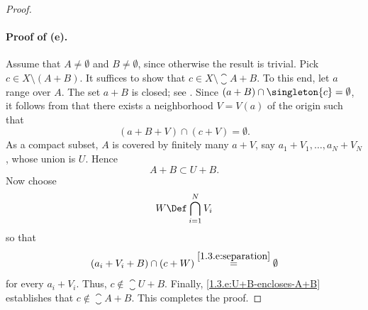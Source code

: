 \begin{proof}
\paragraph{Proof of (e).} Assume that $A\neq\emptyset$ and $B\neq\emptyset$, since otherwise the result is trivial. %
Pick $c \in X \setminus (A+B)$. It suffices to show that $c\in X\setminus\closure{A+B}$. To this end, let $a$ range over $A$. %
The set $a+B$ is closed; see . Since $(a+B) \cap \singleton{c} = \emptyset$, it follows from  that %
there exists a neighborhood $V=V(a)$ of the origin such that %
%
\begin{equation}\label{1.3.e:separation}
  (a+B + V) \cap (c+V) = \emptyset.
\end{equation}
%
As a compact subset, $A$ is covered by finitely many $a+V$, say $a_1 + V_1, \dots, a_N + V_N$, whose union is $U$. Hence 
%
\begin{equation}\label{1.3.e:U+B-encloses-A+B}
  A+B \subset U + B.
\end{equation}
%
Now choose
%
\begin{equation}
  W \Def \bigcap_{i=1}^N V_i
\end{equation}
%
so that 
%
\begin{equation}
  (a_i + V_i + B) \cap (c + W) \overset{\eqref{1.3.e:separation}}{=} \emptyset 
\end{equation}
%
for every $a_i + V_i$. Thus, $c \notin \closure{U + B}$. Finally, \eqref{1.3.e:U+B-encloses-A+B} establishes that %
$c \notin \closure{A+B}$. This completes the proof. 
%

\end{proof}
